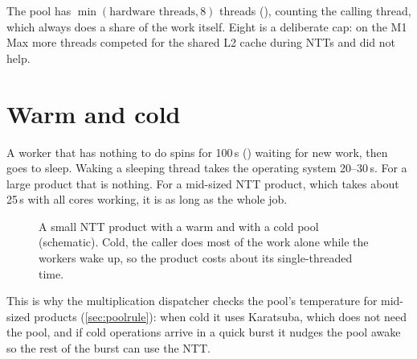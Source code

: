 The pool has $\min(\text{hardware threads}, 8)$ threads (),
counting the calling thread, which always does a share of the work itself. Eight is a
deliberate cap: on the M1 Max more threads competed for the shared L2 cache during NTTs and
did not help.

\section{Warm and cold}
\label{sec:warmcold}

A worker that has nothing to do spins for 100\,\textmu s () waiting for
new work, then goes to sleep. Waking a sleeping thread takes the operating system 20--30\,\textmu s.
For a large product that is nothing. For a mid-sized NTT product, which takes about 25\,\textmu s
with all cores working, it is as long as the whole job.

\begin{figure}[ht]
\centering
{}
\caption{A small NTT product with a warm and with a cold pool (schematic). Cold, the caller
does most of the work alone while the workers wake up, so the product costs about its
single-threaded time.}
\end{figure}

This is why the multiplication dispatcher checks the pool's temperature for mid-sized
products (\cref{sec:poolrule}): when cold it uses Karatsuba, which does not need the pool,
and if cold operations arrive in a quick burst it nudges the pool awake so the rest of the
burst can use the NTT.

